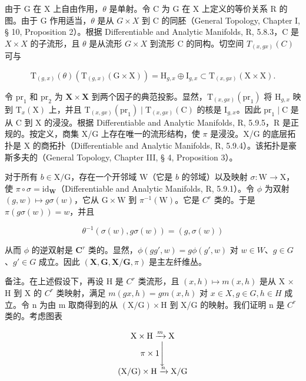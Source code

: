 由于 G 在 X 上自由作用，\(\theta\) 是单射。令 C 为 G 在 X 上定义的等价关系 R 的图。由于 G 作用适当，\(\theta\) 是从 \(G \times X\) 到 C 的同胚（General Topology, Chapter I, § 10, Proposition 2）。根据 Differentiable and Analytic Manifolds, R, 5.8.3，C 是 \(X \times X\) 的子流形，且 \(\theta\) 是从流形 \(G \times X\) 到流形 C 的同构。切空间 \(T_{(x,gx)}(C)\) 可与

\[
\mathrm{T} _ {(g, x)} (\theta) \left(\mathrm{T} _ {(g, x)} (\mathrm{G} \times \mathrm{X})\right) = \mathrm{H} _ {g, x} \oplus \mathrm{I} _ {g, x} \subset \mathrm{T} _ {(x, g x)} (\mathrm{X} \times \mathrm{X}).
\]

令 \(\mathrm{pr}_1\) 和 \(\mathrm{pr}_2\) 为 \(\mathbf{X} \times \mathbf{X}\) 到两个因子的典范投影。显然，\(\mathrm{T}_{(x,gx)}(\mathrm{pr}_1)\) 将 \(\mathrm{H}_{g,x}\) 映到 \(\mathrm{T}_x(\mathrm{X})\) 上，并且 \(\mathrm{T}_{(x,gx)}(\mathrm{pr}_1) \mid \mathrm{T}_{(x,gx)}(\mathrm{C})\) 的核是 \(\mathrm{I}_{g,x}\)。因此 \(\mathrm{pr}_1 \mid \mathrm{C}\) 是从 \(\mathrm{C}\) 到 \(\mathrm{X}\) 的浸没。根据 Differentiable and Analytic Manifolds, R, 5.9.5，R 是正规的。按定义，商集 X/G 上存在唯一的流形结构，使 \(\pi\) 是浸没。X/G 的底层拓扑是 X 的商拓扑（Differentiable and Analytic Manifolds, R, 5.9.4）。该拓扑是豪斯多夫的（General Topology, Chapter III, § 4, Proposition 3）。

对于所有 \(b \in \mathrm{X} / \mathrm{G}\)，存在一个开邻域 \(\mathrm{W}\)（它是 \(b\) 的邻域）以及映射 \(\sigma: \mathrm{W} \to \mathrm{X}\)，使 \(\pi \circ \sigma = \mathrm{id}_{\mathbf{W}}\)（Differentiable and Analytic Manifolds, R, 5.9.1）。令 \(\phi\) 为双射 \((g, w) \mapsto g\sigma(w)\)，它从 \(\mathrm{G} \times \mathrm{W}\) 到 \(\pi^{-1}(\mathrm{W})\)。它是 \(C^r\) 类的。于是 \(\pi(g\sigma(w)) = w\)，并且

\[
\theta^ {- 1} (\sigma (w), g \sigma (w)) = (g, \sigma (w))
\]

从而 \(\phi\) 的逆双射是 \(\mathbf{C}^r\) 类的。显然，\(\phi(gg', w) = g\phi(g', w)\) 对 \(w \in W\)、\(g \in G\)、\(g' \in G\) 成立。因此 \((\mathbf{X}, \mathbf{G}, \mathbf{X}/\mathbf{G}, \pi)\) 是主左纤维丛。

备注。在上述假设下，再设 H 是 \(C^{r}\) 类流形，且 \((x, h) \mapsto m(x, h)\) 是从 X × H 到 X 的 \(C^{r}\) 类映射，满足 \(m(gx, h) = gm(x, h)\) 对 \(x \in X, g \in G, h \in H\) 成立。令 n 为由 m 取商得到的从 \((\mathrm{X}/\mathrm{G}) \times \mathrm{H}\) 到 X/G 的映射。我们证明 n 是 \(C^{r}\) 类的。考虑图表

\[
\begin{array}{c} \mathrm{X} \times \mathrm{H} \xrightarrow {m} \mathrm{X} \\ \pi \times 1 \Biggl \downarrow \\ (\mathrm{X} / \mathrm{G}) \times \mathrm{H} \xrightarrow {n} \mathrm{X} / \mathrm{G} \end{array}
\]


